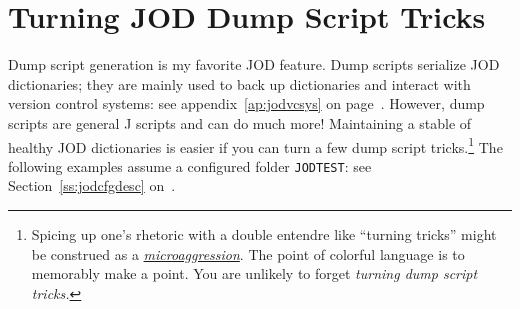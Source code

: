 \section{Turning JOD Dump Script Tricks}\label{ap:joddumptricks}

Dump script generation is my favorite JOD feature. Dump scripts serialize 
JOD dictionaries; they are mainly used to back up dictionaries and interact with 
version control systems: see appendix~\ref{ap:jodvcsys} on page~\pageref{ap:jodvcsys}.
However, dump scripts are general J scripts and can do much more!  
Maintaining a stable of healthy JOD dictionaries is easier 
if you can turn a few dump script tricks.\footnote{Spicing up one's rhetoric with a double entendre 
like ``turning tricks'' might be construed as a 
\href{https://thefederalist.com/2015/03/24/microaggressions-and-trigger-warnings-meet-real-trauma/}{\emph{microaggression}}. 
The point of colorful language is to memorably make a point. 
You are unlikely to forget \emph{turning dump script tricks.} 
} The following examples assume a configured folder \verb|JODTEST|: see Section~\ref{ss:jodcfgdesc} on~\pageref{ss:jodcfgdesc}.

